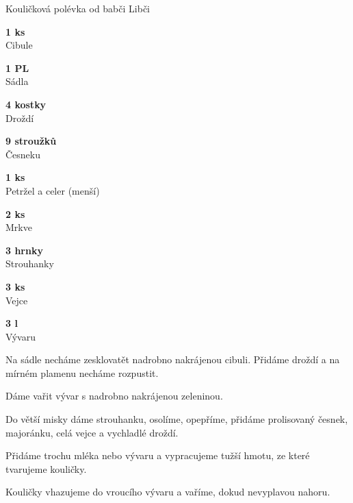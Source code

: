 \documentclass[11pt,a4paper]{article}
\begin{document}
\begin{recipe}[Plum]{Kouličková polévka od babči Libči}
    \begin{ingredients}
        \item \parbox[t]{\linewidth}{\raggedright \piece \textbf{1 ks}\\ Cibule}
        \item \parbox[t]{\linewidth}{\raggedright \spoon \textbf{1 PL}\\ Sádla}
        \item \parbox[t]{\linewidth}{\raggedright \piece \textbf{4 kostky}\\ Droždí}
        \item \parbox[t]{\linewidth}{\raggedright \piece \textbf{9 stroužků}\\ Česneku}
        \item \parbox[t]{\linewidth}{\raggedright \piece \textbf{1 ks}\\ Petržel a celer (menší)}
        \item \parbox[t]{\linewidth}{\raggedright \piece \textbf{2 ks}\\ Mrkve}
        \item \parbox[t]{\linewidth}{\raggedright \piece \textbf{3 hrnky}\\ Strouhanky}
        \item \parbox[t]{\linewidth}{\raggedright \piece \textbf{3 ks}\\ Vejce}
        \item \parbox[t]{\linewidth}{\raggedright \liquid \textbf{3 l}\\ Vývaru}
    \end{ingredients}
    \begin{steps}
        \item Na sádle necháme zesklovatět nadrobno nakrájenou cibuli. Přidáme droždí a na mírném plamenu necháme rozpustit. 
        \item Dáme vařit vývar s nadrobno nakrájenou zeleninou. 
        \item Do větší misky dáme strouhanku, osolíme, opepříme, přidáme prolisovaný česnek, majoránku, celá vejce a vychladlé droždí. 
        \item Přidáme trochu mléka nebo vývaru a vypracujeme tužší hmotu, ze které tvarujeme kouličky. 
        \item Kouličky vhazujeme do vroucího vývaru a vaříme, dokud nevyplavou nahoru.
    \end{steps}
\end{recipe}
\end{document}
